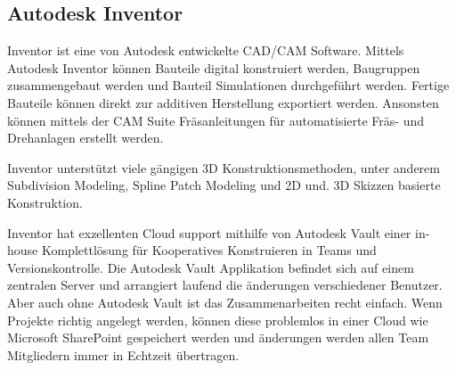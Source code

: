 \subsection{Autodesk Inventor}
\label{sec:inventor}

Inventor ist eine von Autodesk entwickelte CAD/CAM Software. Mittels Autodesk Inventor können Bauteile digital konstruiert werden, Baugruppen zusammengebaut werden und Bauteil Simulationen durchgeführt werden. Fertige Bauteile können direkt zur additiven Herstellung exportiert werden. Ansonsten können mittels der CAM Suite Fräsanleitungen für automatisierte Fräs- und Drehanlagen erstellt werden.

Inventor unterstützt viele gängigen 3D Konstruktionsmethoden, unter anderem Subdivision Modeling, Spline Patch Modeling und 2D und. 3D Skizzen basierte Konstruktion.

Inventor hat exzellenten Cloud support mithilfe von Autodesk Vault einer in-house Komplettlösung für Kooperatives Konstruieren in Teams und Versionskontrolle. Die Autodesk Vault Applikation befindet sich auf einem zentralen Server und arrangiert laufend die änderungen verschiedener Benutzer. Aber auch ohne Autodesk Vault ist das Zusammenarbeiten recht einfach. Wenn Projekte richtig angelegt werden, können diese problemlos in einer Cloud wie Microsoft SharePoint gespeichert werden und änderungen werden allen Team Mitgliedern immer in Echtzeit übertragen.
